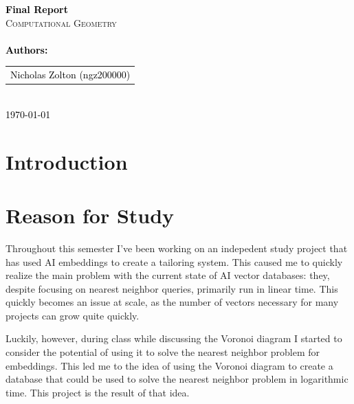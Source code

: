 \documentclass{article}
\begin{document}
\begin{titlepage}
    \selectfont 
    \vspace*{3cm}
    
    \centering
    {\Huge \textbf{\textcolor{black}{Final Report}}}\\[1.5cm]
    \textsc{\LARGE Computational Geometry}\\[0.5cm]
    \\[2cm]
    
    {\Large \textbf{\textcolor{black}{Authors:}}}\\[0.5cm]
    \begin{tabular}{c}
        \Large \textcolor{black}{Nicholas Zolton (ngz200000)} \\
    \end{tabular}\\[2cm]
    
    {\Large \textcolor{black}{\today}}
    
    \vfill
\addtocounter{page}{-2}
\end{titlepage}

\tableofcontents
\addtocounter{page}{-1}
\newpage

\section*{Introduction}

\section{Reason for Study}
Throughout this semester I've been working on an indepedent study 
project that has used AI embeddings to create a tailoring system. 
This caused me to quickly realize the main problem with the current
state of AI vector databases: they, despite focusing on nearest neighbor
queries, primarily run in linear time. This quickly becomes an issue
at scale, as the number of vectors necessary for many projects can 
grow quite quickly.
\newline

\noindent
Luckily, however, during class while discussing the Voronoi diagram
I started to consider the potential of using it to solve the nearest
neighbor problem for embeddings. This led me to the idea of using the Voronoi diagram
to create a database that could be used to solve the nearest neighbor
problem in logarithmic time. This project is the result of that idea.
\end{document}
